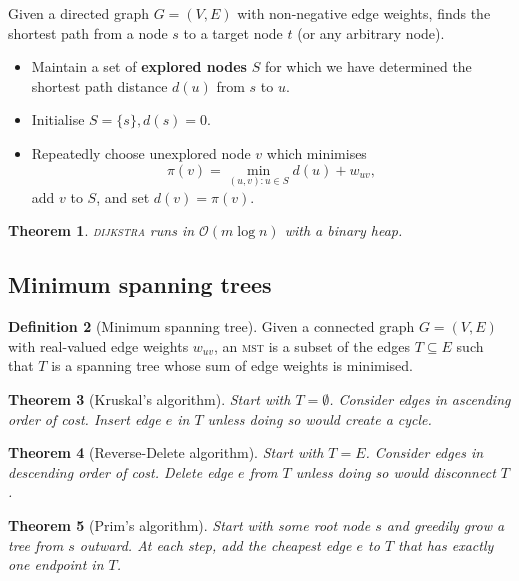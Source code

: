 \documentclass[10pt, oneside, reqno]{amsart}
\theoremstyle{plain}%
\newtheorem{thm}{Theorem}[section]
\theoremstyle{definition}
\newtheorem{defn}[thm]{Definition}
\theoremstyle{remark}
\newcommand{\bigo}[1]{\mathcal{O}(#1)}
\begin{document}
Given a directed graph $G = (V,E)$ with non-negative edge weights, finds the shortest path from a node $s$ to a target node $t$ (or any arbitrary node).
\begin{itemize}
    \item Maintain a set of \textbf{explored nodes} $S$ for which we have determined the shortest path distance $d(u)$ from $s$ to $u$.
    \item Initialise $S = \{s\}, d(s) = 0$.
    \item Repeatedly choose unexplored node $v$ which minimises \[
        \pi(v) = \min_{(u,v): u \in S} d(u) + w_{uv},
    \]
    add $v$ to $S$, and set $d(v) = \pi(v)$.
\end{itemize}

\begin{thm}
    \textsc{dijkstra} runs in $\bigo{m \log n}$ with a binary heap.
\end{thm}

\subsection{Minimum spanning trees} %
\label{sub:minimum_spanning_trees}

\begin{defn}[Minimum spanning tree]
    Given a connected graph $G = (V,E)$ with real-valued edge weights $w_{uv}$, an \textsc{mst} is a subset of the edges $T \subseteq E$ such that $T$ is a spanning tree whose sum of edge weights is minimised.
\end{defn}

\begin{thm}[Kruskal's algorithm]
    Start with $T = \emptyset$.  Consider edges in ascending order of cost.  Insert edge $e$ in $T$ unless doing so would create a cycle.
\end{thm}

\begin{thm}[Reverse-Delete algorithm]
    Start with $T = E$.  Consider edges in descending order of cost.  Delete edge $e$ from $T$ unless doing so would disconnect $T$.
\end{thm}

\begin{thm}[Prim's algorithm]
    Start with some root node $s$ and greedily grow a tree from $s$ outward.  At each step, add the cheapest edge $e$ to $T$ that has exactly one endpoint in $T$.
\end{thm}
\end{document}
